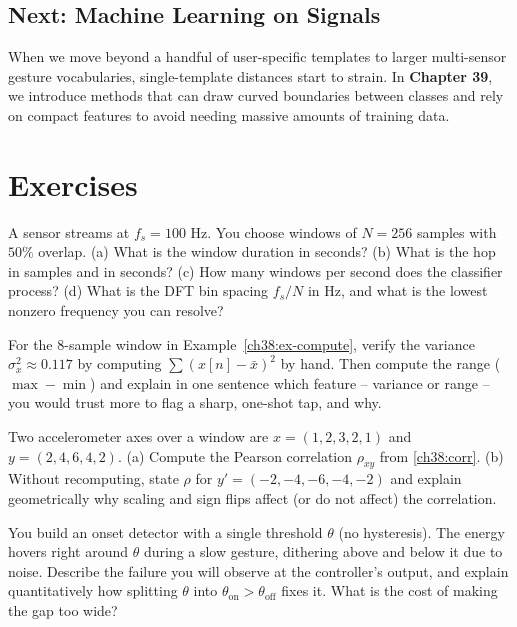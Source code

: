 \subsection{Next: Machine Learning on Signals}
When we move beyond a handful of user-specific templates to larger multi-sensor gesture vocabularies, single-template distances start to strain. In \textbf{Chapter 39}, we introduce methods that can draw curved boundaries between classes and rely on compact features to avoid needing massive amounts of training data.

\section{Exercises}
\label{ch38:exercises}

\begin{exercise}
A sensor streams at $f_s = 100$ Hz. You choose windows of $N = 256$ samples with
$50\%$ overlap. (a) What is the window duration in seconds? (b) What is the hop in
samples and in seconds? (c) How many windows per second does the classifier
process? (d) What is the DFT bin spacing $f_s/N$ in Hz, and what is the lowest
nonzero frequency you can resolve?
\end{exercise}

\begin{exercise}
For the 8-sample window in Example~\ref{ch38:ex-compute}, verify the variance
$\sigma_x^2 \approx 0.117$ by computing $\sum (x[n]-\bar x)^2$ by hand. Then
compute the range ($\max-\min$) and explain in one sentence which feature --
variance or range -- you would trust more to flag a sharp, one-shot tap, and why.
\end{exercise}

\begin{exercise}
Two accelerometer axes over a window are $x = (1,2,3,2,1)$ and $y = (2,4,6,4,2)$.
(a) Compute the Pearson correlation $\rho_{xy}$ from \eqref{ch38:corr}. (b) Without
recomputing, state $\rho$ for $y' = (-2,-4,-6,-4,-2)$ and explain geometrically
why scaling and sign flips affect (or do not affect) the correlation.
\end{exercise}

\begin{exercise}
You build an onset detector with a single threshold $\theta$ (no hysteresis). The
energy hovers right around $\theta$ during a slow gesture, dithering above and
below it due to noise. Describe the failure you will observe at the controller's
output, and explain quantitatively how splitting $\theta$ into
$\theta_{\text{on}} > \theta_{\text{off}}$ fixes it. What is the cost of making the
gap too wide?
\end{exercise}

